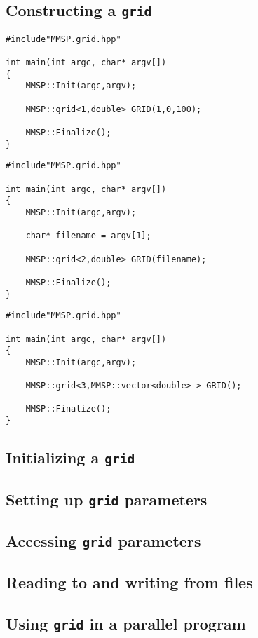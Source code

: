\subsection{Constructing a {\tt grid}}
\begin{verbatim}
#include"MMSP.grid.hpp"

int main(int argc, char* argv[])
{
    MMSP::Init(argc,argv);

	MMSP::grid<1,double> GRID(1,0,100);

    MMSP::Finalize();
}
\end{verbatim}

\begin{verbatim}
#include"MMSP.grid.hpp"

int main(int argc, char* argv[])
{
    MMSP::Init(argc,argv);

    char* filename = argv[1];

	MMSP::grid<2,double> GRID(filename);

    MMSP::Finalize();
}
\end{verbatim}

\begin{verbatim}
#include"MMSP.grid.hpp"

int main(int argc, char* argv[])
{
    MMSP::Init(argc,argv);

	MMSP::grid<3,MMSP::vector<double> > GRID();

    MMSP::Finalize();
}
\end{verbatim}
\subsection{Initializing a {\tt grid}}
\subsection{Setting up {\tt grid} parameters}
\subsection{Accessing {\tt grid} parameters}
\subsection{Reading to and writing from files}
\subsection{Using {\tt grid} in a parallel program}

